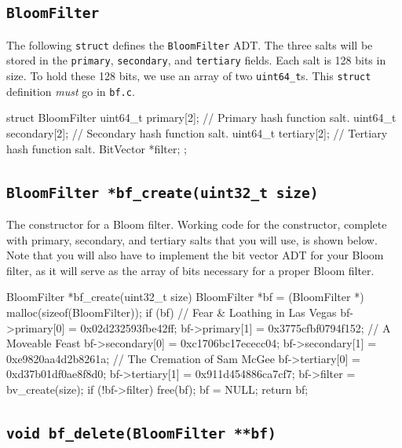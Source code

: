 \documentclass{article}
\begin{document}
\subsection{\texttt{BloomFilter}}

The following \texttt{struct} defines the \texttt{BloomFilter} ADT. The
three salts will be stored in the \texttt{primary}, \texttt{secondary},
and \texttt{tertiary} fields. Each salt is 128 bits in size. To hold
these 128 bits, we use an array of two \texttt{uint64\_t}s. This
\texttt{struct} definition \emph{must} go in \texttt{bf.c}.

\begin{codelisting}{}
struct BloomFilter {
  uint64_t primary[2];   // Primary hash function salt.
  uint64_t secondary[2]; // Secondary hash function salt.
  uint64_t tertiary[2];  // Tertiary hash function salt.
  BitVector *filter;
};
\end{codelisting}

\subsection{\texttt{BloomFilter *bf\_create(uint32\_t size)}}

The constructor for a Bloom filter. Working code for the constructor,
complete with primary, secondary, and tertiary salts that you will use,
is shown below. Note that you will also have to implement the bit vector
ADT for your Bloom filter, as it will serve as the array of bits
necessary for a proper Bloom filter.

\begin{codelisting}{}
BloomFilter *bf_create(uint32_t size) {
  BloomFilter *bf = (BloomFilter *) malloc(sizeof(BloomFilter));
  if (bf) {
    // Fear & Loathing in Las Vegas
    bf->primary[0] = 0x02d232593fbe42ff;
    bf->primary[1] = 0x3775cfbf0794f152;
    // A Moveable Feast
    bf->secondary[0] = 0xc1706bc17ececc04;
    bf->secondary[1] = 0xe9820aa4d2b8261a;
    // The Cremation of Sam McGee
    bf->tertiary[0] = 0xd37b01df0ae8f8d0;
    bf->tertiary[1] = 0x911d454886ca7cf7;
    bf->filter = bv_create(size);
    if (!bf->filter) {
      free(bf);
      bf = NULL;
    }
  }
  return bf;
}
\end{codelisting}

\subsection{\texttt{void bf\_delete(BloomFilter **bf)}}
\end{document}
